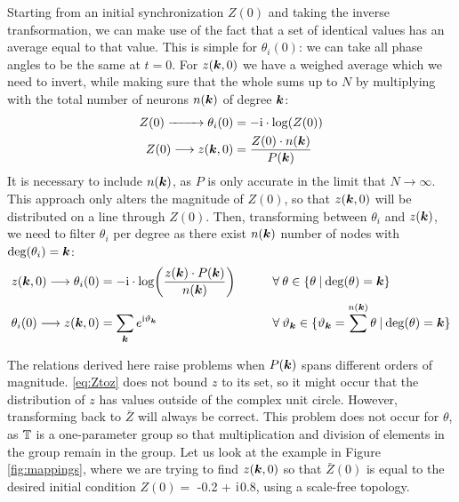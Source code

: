 Starting from an initial synchronization $Z(0)$ and taking the inverse tranfsormation, we can make use of the fact that a set of identical values has an average equal to that value. This is simple for $\theta_i(0)$: we can take all phase angles to be the same at $t = 0$. For $z({\boldsymbol{k}},0)$ we have a weighed average which we need to invert, while making sure that the whole sums up to $N$ by multiplying with the total number of neurons $n({\boldsymbol{k}})$ of degree ${\boldsymbol{k}}$:
\begin{align}
Z(0) \xrightarrow{\hspace*{8mm}} \theta_i(0) &= -\ic \cdot \log \left( Z(0) \right)  \label{eq:Ztotheta} \\
Z(0) \longrightarrow z(\k,0) &= \frac{Z(0) \cdot n(\k)}{P(\k)} \label{eq:Ztoz}
\end{align}
It is necessary to include $n({\boldsymbol{k}})$, as $P$ is only accurate in the limit that $N \rightarrow \infty$. This approach only alters the magnitude of $Z(0)$, so that $z({\boldsymbol{k}},0)$ will be distributed on a line through $Z(0)$. Then, transforming between $\theta_i$ and $z({\boldsymbol{k}})$, we need to filter $\theta_i$ per degree as there exist $n({\boldsymbol{k}})$ number of nodes with ${\rm deg} ( \theta_i ) = {\boldsymbol{k}}$:
\begin{alignat}{2}
z(\k,0) \longrightarrow \theta_i(0) &= -\ic \cdot \log \left( \frac{z(\k)\cdot P(\k)}{n(\k)} \right) \qquad &&\forall \: \theta \in \{ \theta \: | \: \degree(\theta) = \k \}  \label{eq:ztottheta}\\
\theta_i(0) \longrightarrow z(\k,0) &= \sum_{\k} e^{\ic \vartheta_{\k}} \qquad \qquad &&\forall \: \vartheta_{\k} \in \{ \vartheta_{\k} = \sum^{n(\k)} \theta \: | \: \degree(\theta) = \k \} \label{eq:thetatoz}
\end{alignat}

The relations derived here raise problems when $P({\boldsymbol{k}})$ spans different orders of magnitude. \eqref{eq:Ztoz} does not bound $z$ to its set, so it might occur that the distribution of $z$ has values outside of the complex unit circle. However, transforming back to $\bar{Z}$ will always be correct. This problem does not occur for $\theta$, as ${\mathbb{T}}$ is a one-parameter group so that multiplication and division of elements in the group remain in the group. Let us look at the example in Figure \ref{fig:mappings}, where we are trying to find $z({\boldsymbol{k}}, 0)$ so that $\bar{Z}(0)$ is equal to the desired initial condition $Z(0) = $ -0.2 + ${\rm{i}}$0.8, using a scale-free topology. \\

